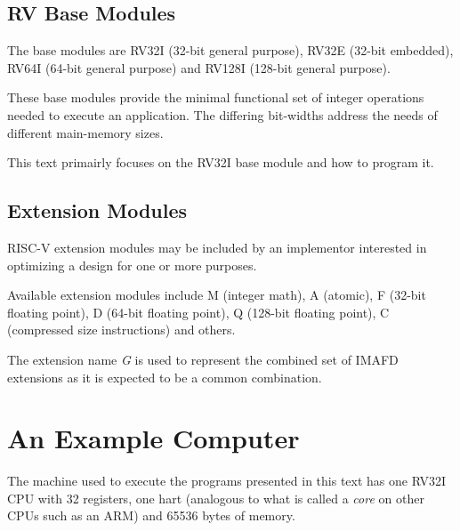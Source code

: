 \subsection{RV Base Modules}
The base modules are RV32I (32-bit general purpose), 
RV32E (32-bit embedded), RV64I (64-bit general purpose) 
and RV128I (128-bit general purpose).

These base modules provide the minimal functional set of integer operations
needed to execute an application.  The differing bit-widths address
the needs of different main-memory sizes.

This text primairly focuses on the RV32I base module and how to program it.


\subsection{Extension Modules}

RISC-V extension modules may be included by an implementor interested
in optimizing a design for one or more purposes.

Available extension modules include M (integer math), A (atomic),
F (32-bit floating point), D (64-bit floating point), 
Q (128-bit floating point), C (compressed size instructions) and others.

The extension name {\em G} is used to represent the combined set of IMAFD
extensions as it is expected to be a common combination.



\section{An Example Computer}

%
The machine used to execute the programs presented in this text
has one RV32I CPU with 32 registers, one \acrshort{hart} 
(analogous to what is called a {\em core} on other CPUs such as an ARM)
and 65536 bytes of memory.  



